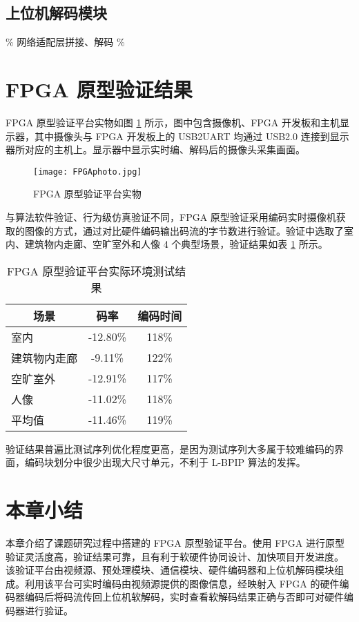 \subsection{上位机解码模块}
\% 网络适配层拼接、解码 \%

\section{FPGA 原型验证结果}
FPGA 原型验证平台实物如图 \ref{fig:FPGAphoto} 所示，图中包含摄像机、FPGA 开发板和主机显示器，其中摄像头与 FPGA 开发板上的 USB2UART 均通过 USB2.0 连接到显示器所对应的主机上。显示器中显示实时编、解码后的摄像头采集画面。
\begin{figure}[hbt]
    \centering
    \texttt{[image: FPGAphoto.jpg]}
    \caption{FPGA 原型验证平台实物}
    \label{fig:FPGAphoto}
\end{figure}

与算法软件验证、行为级仿真验证不同，FPGA 原型验证采用编码实时摄像机获取的图像的方式，通过对比硬件编码输出码流的字节数进行验证。验证中选取了室内、建筑物内走廊、空旷室外和人像 4 个典型场景，验证结果如表 \ref{tab:FPGADemoTestTab} 所示。
\begin{table}[hbt]
    \centering
    \caption{FPGA 原型验证平台实际环境测试结果}
    \label{tab:FPGADemoTestTab}
    \begin{tabular}{@{}lcc@{}}
        \toprule
        \multicolumn{1}{c}{场景} & 码率     & 编码时间 \\ \midrule
        室内                     & -12.80\% & 118\%    \\
        建筑物内走廊             & -9.11\%  & 122\%    \\
        空旷室外                 & -12.91\% & 117\%    \\
        人像                     & -11.02\% & 118\%    \\ \midrule
        平均值                   & -11.46\% & 119\%    \\ \bottomrule
    \end{tabular}
\end{table}

验证结果普遍比测试序列优化程度更高，是因为测试序列大多属于较难编码的界面，编码块划分中很少出现大尺寸单元，不利于 L-BPIP 算法的发挥。

\section{本章小结}
本章介绍了课题研究过程中搭建的 FPGA 原型验证平台。使用 FPGA 进行原型验证灵活度高，验证结果可靠，且有利于软硬件协同设计、加快项目开发进度。
该验证平台由视频源、预处理模块、通信模块、硬件编码器和上位机解码模块组成。利用该平台可实时编码由视频源提供的图像信息，经映射入 FPGA 的硬件编码器编码后将码流传回上位机软解码，实时查看软解码结果正确与否即可对硬件编码器进行验证。